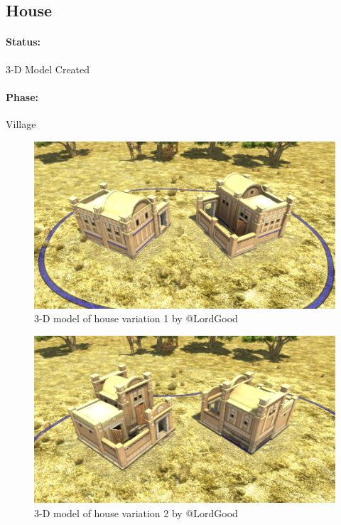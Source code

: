 \documentclass[a4paper,12pt]{scrreprt}
\begin{document}
\subsection{House}

\paragraph{Status:} 3-D Model Created\\
\paragraph{Phase:} Village\\

\begin{figure}[H]
	\centering
	\includegraphics[width=\textwidth]{img/house/house_variation1}
	\caption{3-D model of house variation 1 by @LordGood}
\end{figure}

\begin{figure}[H]
	\centering
	\includegraphics[width=\textwidth]{img/house/house_variation2}
	\caption{3-D model of house variation 2 by @LordGood}
\end{figure}
\end{document}
